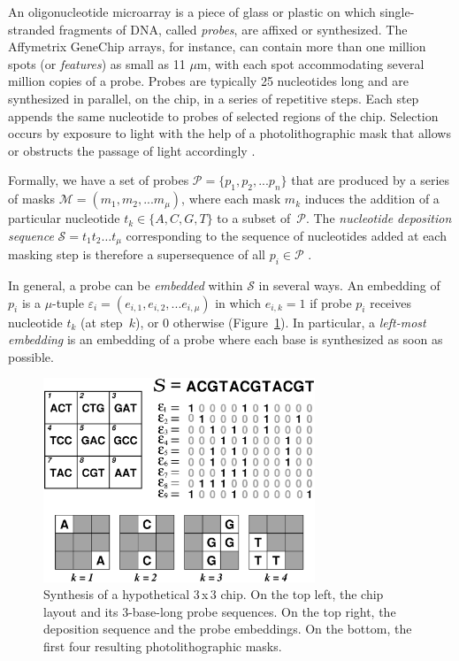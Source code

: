 \documentclass{llncs}
\begin{document}
An oligonucleotide microarray is a piece of glass or plastic on which
single-stranded fragments of DNA, called \emph{probes}, are affixed or
synthesized. The Affymetrix GeneChip\raisebox{.6ex}{\scriptsize \textregistered}
arrays, for instance, can contain
more than one million spots (or \emph{features}) as small as 11 $\mu$m,
with each spot accommodating several million copies of a probe. Probes
are typically 25 nucleotides long and are synthesized in parallel, on
the chip, in a series of repetitive steps. Each step appends the same
nucleotide to probes of selected regions of the chip. Selection occurs
by exposure to light with the help of a photolithographic mask that
allows or obstructs the passage of light accordingly \cite{FODOR91}.

Formally, we have a set of probes $\mathcal{P} = \{p_{1}, p_{2}, ... p_{n}\}$
that are produced by a series of masks $\mathcal{M} = (m_{1}, m_{2}, ... m_{\mu})$,
where each mask $m_{k}$ induces the addition of a particular nucleotide
$t_{k} \in \{A, C, G, T\}$ to a subset of~$\mathcal{P}$. The \emph{nucleotide
deposition sequence} $\mathcal{S} = t_{1} t_{2} \ldots t_{\mu}$ corresponding
to the sequence of nucleotides added at each masking step is therefore a
supersequence of all $p_{i} \in \mathcal{P}$ \cite{RAHMANN03}.

In general, a probe can be \emph{embedded} within $\mathcal{S}$ in several
ways. An embedding of $p_{i}$ is a $\mu$-tuple
$\varepsilon_{i} = (e_{i,1}, e_{i,2}, ... e_{i,\mu})$ in which $e_{i,k} = 1$
if probe $p_{i}$ receives nucleotide $t_{k}$ (at step~$k$), or 0 otherwise
(Figure~\ref{fig:masking_process}). In particular, a \emph{left-most embedding}
is an embedding of a probe where each base is synthesized as soon as possible.

\begin{figure}
\centerline{\includegraphics[width=230pt]{chip}}
\caption{Synthesis of a hypothetical 3\,x\,3 chip. On the top left, the chip layout and its 3-base-long probe sequences. On the top right, the deposition sequence and the probe embeddings. On the bottom, the first four resulting photolithographic masks.}
\label{fig:masking_process}
\end{figure}
\end{document}
